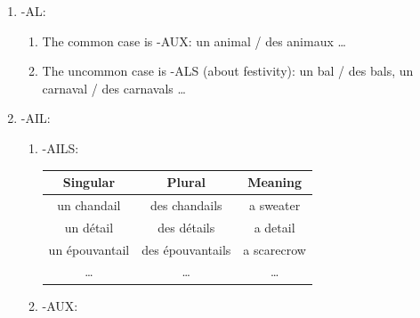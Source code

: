 \documentclass{book}
\begin{document}
\begin{enumerate}
\begin{itemize}
\begin{itemize}
                \end{itemize}
                * The phrase to memorize is: 
                \begin{center}
                    Viens mon \textcolor{red}{chou}, mon \textcolor{red}{hibou}, mon \textcolor{red}{bijou}, mon \textcolor{red}{joujou}, sur mes genoux, et jette des \textcolor{red}{cailloux} a` ce \textcolor{red}{hibou} plein de \textcolor{red}{poux}. \\
                    (Come my cabbage, my owl, my jewel, my toy, on my knees, and throw pebbles at this owl full of lice.)
                \end{center}
            \end{itemize}
            \item -AL: 
            \begin{enumerate}
                \item The common case is -AUX: un animal / des animaux \dots
                \item The uncommon case is -ALS (about festivity): un bal / des bals, un carnaval / des carnavals \dots
            \end{enumerate}
            \item -AIL:
            \begin{enumerate}
                \item -AILS:
                \begin{center}
                    \begin{tabular}{|c|c|c|}
                        \hline
                        \textbf{Singular} & \textbf{Plural} & \textbf{Meaning}\\
                        \hline
                        un chandail & des chandails & a sweater\\
                        \hline
                        un détail & des détails & a detail\\
                        \hline
                        un épouvantail & des épouvantails & a scarecrow\\
                        \hline
                        \dots & \dots & \dots\\
                        \hline
                    \end{tabular}
                \end{center}
                \item -AUX:
                \begin{center}
                    \begin{tabular}{|c|c|c|}

\end{tabular}
\end{center}
\end{enumerate}
\end{enumerate}
\end{document}
